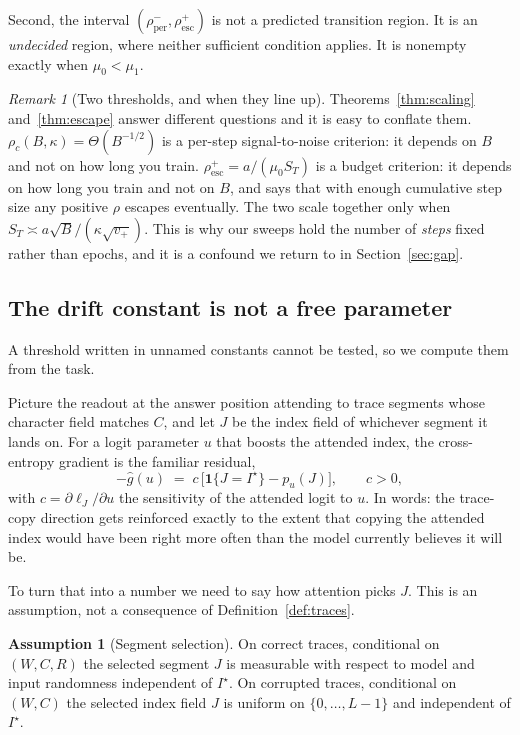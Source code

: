 \documentclass{article}
\theoremstyle{plain}
\theoremstyle{definition}
\newtheorem{assumption}{Assumption}
\theoremstyle{remark}
\newtheorem{remark}{Remark}
\newcommand{\1}{\mathbf{1}}
\begin{document}
Second, the interval $(\rho^{-}_{\mathrm{per}},\rho^{+}_{\mathrm{esc}})$ is not a
predicted transition region. It is an \emph{undecided} region, where neither
sufficient condition applies. It is nonempty exactly when $\mu_0<\mu_1$.

\begin{remark}[Two thresholds, and when they line up]
\label{rem:twothresholds}
Theorems~\ref{thm:scaling} and~\ref{thm:escape} answer different questions and it
is easy to conflate them. $\rho_c(B,\kappa)=\Theta(B^{-1/2})$ is a per-step
signal-to-noise criterion: it depends on $B$ and not on how long you train.
$\rho^{+}_{\mathrm{esc}} = a/(\mu_0S_T)$ is a budget criterion: it depends on how
long you train and not on $B$, and says that with enough cumulative step size any
positive $\rho$ escapes eventually. The two scale together only when
$S_T\asymp a\sqrt B/(\kappa\sqrt{v_+})$. This is why our sweeps hold the number
of \emph{steps} fixed rather than epochs, and it is a confound we return to in
Section~\ref{sec:gap}.
\end{remark}

\subsection{The drift constant is not a free parameter}
\label{sec:drift}

A threshold written in unnamed constants cannot be tested, so we compute them
from the task.

Picture the readout at the answer position attending to trace segments whose
character field matches $C$, and let $J$ be the index field of whichever segment
it lands on. For a logit parameter $u$ that boosts the attended index, the
cross-entropy gradient is the familiar residual,
\begin{equation}
\label{eq:gradform}
-\hat g(u) \;=\; c\,\big[\1\{J = I^\star\} - p_u(J)\big],
\qquad c > 0,
\end{equation}
with $c=\partial\ell_J/\partial u$ the sensitivity of the attended logit to $u$.
In words: the trace-copy direction gets reinforced exactly to the extent that
copying the attended index would have been right more often than the model
currently believes it will be.

To turn that into a number we need to say how attention picks $J$. This is an
assumption, not a consequence of Definition~\ref{def:traces}.

\begin{assumption}[Segment selection]
\label{ass:selection}
On correct traces, conditional on $(W,C,R)$ the selected segment $J$ is
measurable with respect to model and input randomness independent of $I^\star$.
On corrupted traces, conditional on $(W,C)$ the selected index field $J$ is
uniform on $\{0,\dots,L-1\}$ and independent of $I^\star$.
\end{assumption}
\end{document}
